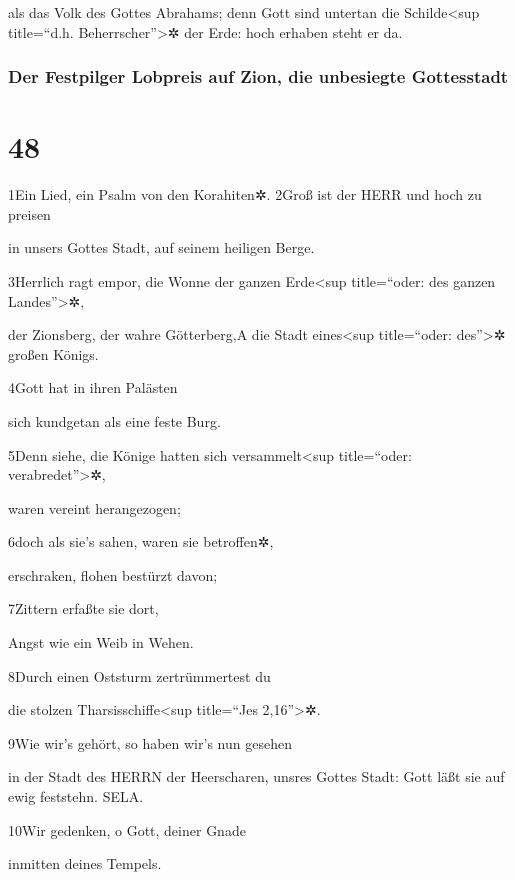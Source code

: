 als das Volk des Gottes Abrahams; denn Gott sind untertan die
Schilde\textless sup title=``d.h. Beherrscher''\textgreater✲ der Erde:
hoch erhaben steht er da.

\hypertarget{der-festpilger-lobpreis-auf-zion-die-unbesiegte-gottesstadt}{%
\subsubsection{Der Festpilger Lobpreis auf Zion, die unbesiegte
Gottesstadt}\label{der-festpilger-lobpreis-auf-zion-die-unbesiegte-gottesstadt}}

\hypertarget{section-47}{%
\section{48}\label{section-47}}

1Ein Lied, ein Psalm von den Korahiten✲. 2Groß ist der HERR und hoch zu
preisen

in unsers Gottes Stadt, auf seinem heiligen Berge.

3Herrlich ragt empor, die Wonne der ganzen Erde\textless sup
title=``oder: des ganzen Landes''\textgreater✲,

der Zionsberg, der wahre Götterberg,{A} die Stadt eines\textless sup
title=``oder: des''\textgreater✲ großen Königs.

4Gott hat in ihren Palästen

sich kundgetan als eine feste Burg.

5Denn siehe, die Könige hatten sich versammelt\textless sup
title=``oder: verabredet''\textgreater✲,

waren vereint herangezogen;

6doch als sie's sahen, waren sie betroffen✲,

erschraken, flohen bestürzt davon;

7Zittern erfaßte sie dort,

Angst wie ein Weib in Wehen.

8Durch einen Oststurm zertrümmertest du

die stolzen Tharsisschiffe\textless sup title=``Jes 2,16''\textgreater✲.

9Wie wir's gehört, so haben wir's nun gesehen

in der Stadt des HERRN der Heerscharen, unsres Gottes Stadt: Gott läßt
sie auf ewig feststehn. SELA.

10Wir gedenken, o Gott, deiner Gnade

inmitten deines Tempels.

